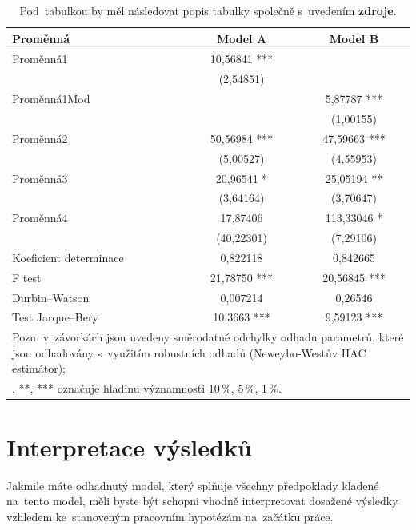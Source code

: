 \documentclass[12pt,a4paper,oneside,final]{article}
\theoremstyle{definition}
\theoremstyle{remark}
\numberwithin{equation}{section}
\begin{document}
\shorthandoff{-}
\begin{table}
\centering
\caption{Pod~tabulkou by měl následovat popis tabulky společně s~uvedením \textbf{zdroje}.}
\begin{tabularx}{.75\textwidth}{lcc}
\textbf{Proměnná} & \textbf{Model A} & \textbf{Model B} \\
\hline
Proměnná1		& 10,56841 ***   & \\
 		   		& (2,54851)      & \\
Proměnná1Mod	&		   		 & 5,87787 *** \\
 				&		  		 & (1,00155) \\  
Proměnná2   	& 50,56984 ***   & 47,59663 *** \\
				& (5,00527)		 & (4,55953) \\
Proměnná3		& 20,96541 *     & 25,05194 ** \\
				& (3,64164)	   	 & (3,70647) \\
Proměnná4		& 17,87406       & 113,33046 * \\
				& (40,22301)     & (7,29106) \\
\hline
Koeficient determinace  & 0,822118		 & 0,842665 \\
F test                  & 21,78750 ***	 & 20,56845 *** \\
Durbin--Watson			& 0,007214 		 & 0,26546 \\
Test Jarque--Bery       & 10,3663 *** 	 & 9,59123 *** \\
\hline
\multicolumn{3}{X}{\footnotesize Pozn. v~závorkách jsou uvedeny směrodatné odchylky odhadu parametrů, které jsou odhadovány s~využitím robustních odhadů (Neweyho-Westův HAC estimátor);} \\
\multicolumn{3}{X}{\footnotesize *, **, *** označuje hladinu významnosti 10\,\%, 5\,\%, 1\,\%.}
\end{tabularx}
\label{tab:koef}
\end{table}
\shorthandon{-}

\section{Interpretace výsledků}

Jakmile máte odhadnutý model, který splňuje všechny předpoklady kladené na~tento model, měli byste být schopni vhodně interpretovat dosažené výsledky vzhledem ke~stanoveným pracovním hypotézám na~začátku práce.
\end{document}
